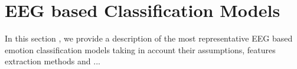 \documentclass{sig-alternate}
\begin{document}


	

\section{EEG based Classification Models}

In this section , we provide a description of the most representative EEG based emotion classification models taking in account their assumptions, features extraction methods and ...

	
\end{document}
